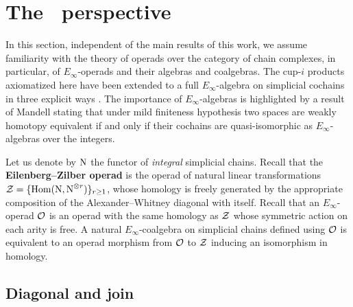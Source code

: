 
\section{The \pdfEinfty\ perspective}\label{s:operads}

In this section, independent of the main results of this work, we assume familiarity with the theory of operads over the category of chain complexes, in particular, of $E_\infty$-operads and their algebras and coalgebras.
The cup-$i$ products axiomatized here have been extended to a full $E_\infty$-algebra on simplicial cochains in three explicit ways \cite{mcclure2003multivariable,berger2004combinatorial,medina2020prop1}.
The importance of $E_\infty$-algebras is highlighted by a result of Mandell \cite{mandell2006homotopy_type} stating that under mild finiteness hypothesis two spaces are weakly homotopy equivalent if and only if their cochains are quasi-isomorphic as $E_\infty$-algebras over the integers.

Let us denote by $\operatorname{N}$ the functor of \textit{integral} simplicial chains.
Recall that the \textbf{Eilenberg--Zilber operad} is the operad of natural linear transformations $\mathcal{Z} = \{\mathrm{Hom}(\operatorname{N}, \operatorname{N}^{\otimes r})\}_{r\geq1}$, whose homology is freely generated by the appropriate composition of the Alexander--Whitney diagonal with itself.
Recall that an $E_\infty$-operad $\mathcal{O}$ is an operad with the same homology as $\mathcal{Z}$ whose symmetric action on each arity is free.
A natural $E_\infty$-coalgebra on simplicial chains defined using $\mathcal{O}$ is equivalent to an operad morphism from $\mathcal{O}$ to $\mathcal{Z}$ inducing an isomorphism in homology.


\subsection{Diagonal and join}

